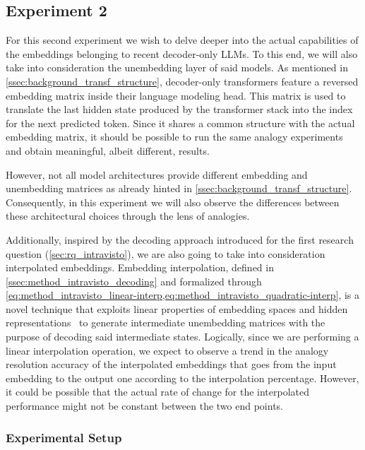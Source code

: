 \subsection{Experiment 2}\label{ssec:exp_emb_exp2}

For this second experiment we wish to delve deeper into the actual capabilities of the embeddings belonging to recent decoder-only LLMs.
To this end, we will also take into consideration the unembedding layer of said models.
As mentioned in \cref{ssec:background_transf_structure}, decoder-only transformers feature a reversed embedding matrix inside their language modeling head.
This matrix is used to translate the last hidden state produced by the transformer stack into the index for the next predicted token.
Since it shares a common structure with the actual embedding matrix, it should be possible to run the same analogy experiments and obtain meaningful, albeit different, results.

However, not all model architectures provide different embedding and unembedding matrices as already hinted in \cref{ssec:background_transf_structure}.
Consequently, in this experiment we will also observe the differences between these architectural choices through the lens of analogies.

Additionally, inspired by the decoding approach introduced for the first research question (\cref{sec:rq_intravisto}), we are also going to take into consideration interpolated embeddings.
Embedding interpolation, defined in \cref{ssec:method_intravisto_decoding} and formalized through \cref{eq:method_intravisto_linear-interp,eq:method_intravisto_quadratic-interp}, is a novel technique that exploits linear properties of embedding spaces and hidden representations~\cite{park2023, mikolov2013, drozd2016} to generate intermediate unembedding matrices with the purpose of decoding said intermediate states.
Logically, since we are performing a linear interpolation operation, we expect to observe a trend in the analogy resolution accuracy of the interpolated embeddings that goes from the input embedding to the output one according to the interpolation percentage.
However, it could be possible that the actual rate of change for the interpolated performance might not be constant between the two end points. 

\subsubsection{Experimental Setup}\label{sssec:exp_emb_exp2_expset}

